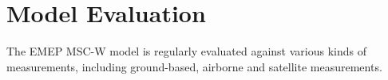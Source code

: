 \setcounter{page}{1}

\cleardoublepage
\chapter[2019 Model Evaluation]{Model Evaluation}
\label{ch:appx_modeleval}



The EMEP MSC-W model is regularly evaluated against various kinds of measurements, including ground-based, airborne and satellite measurements.





